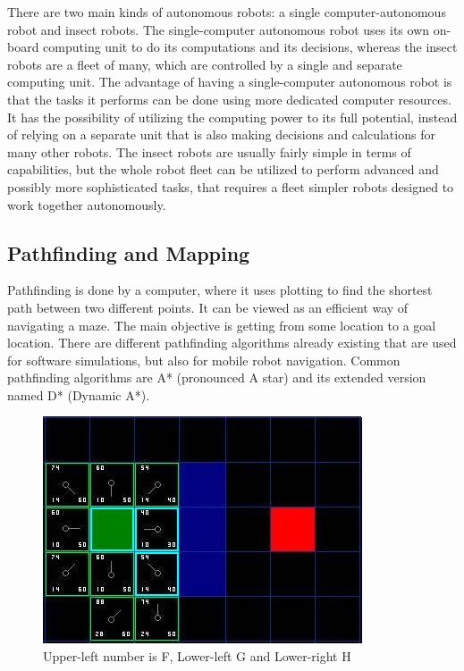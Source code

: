 There are two main kinds of autonomous robots: a single computer-autonomous robot and insect robots. The single-computer autonomous robot uses its own on-board computing unit to do its computations and its decisions, whereas the insect robots are a fleet of many, which are controlled by a single and separate computing unit.
The advantage of having a single-computer autonomous robot is that the tasks it performs can be done using more dedicated computer resources. It has the possibility of utilizing the computing power to its full potential, instead of relying on a separate unit that is also making decisions and calculations for many other robots.
The insect robots are usually fairly simple in terms of capabilities, but the whole robot fleet can be utilized to perform advanced and possibly more sophisticated tasks, that requires a fleet simpler robots designed to work together autonomously\cite{singleandinsect}.


\subsection{Pathfinding and Mapping}

Pathfinding is done by a computer, where it uses plotting to find the shortest path between two different points. It can be viewed as an efficient way of navigating a maze. The main objective is getting from some location to a goal location.
There are different pathfinding algorithms already existing that are used for software simulations, but also for mobile robot navigation. Common pathfinding algorithms are A* (pronounced A star) and its extended version named D* (Dynamic A*).

\begin{figure}[H]
	\centering
	\includegraphics[width=.7\linewidth]{images/aStar2.jpg}
	\caption{Upper-left number is F, Lower-left G and Lower-right H}
	\label{fig:sub2}
\end{figure}

